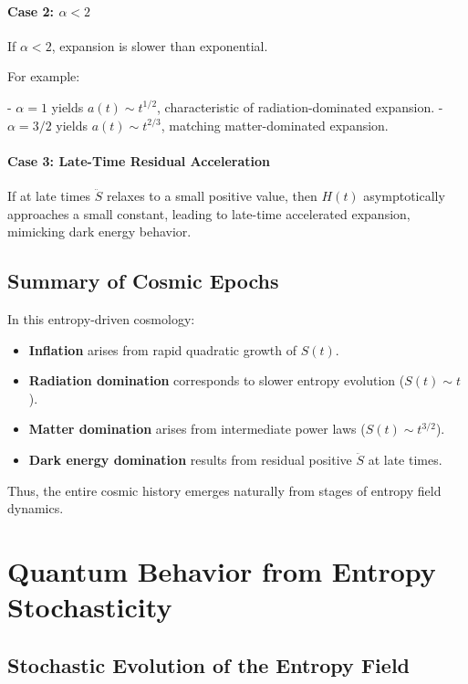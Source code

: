 \documentclass{article}
\begin{document}
\paragraph{Case 2: $\alpha < 2$}

If $\alpha < 2$, expansion is slower than exponential.

For example:

- $\alpha = 1$ yields $a(t) \sim t^{1/2}$, characteristic of radiation-dominated expansion.
- $\alpha = 3/2$ yields $a(t) \sim t^{2/3}$, matching matter-dominated expansion.

\paragraph{Case 3: Late-Time Residual Acceleration}

If at late times $\ddot{S}$ relaxes to a small positive value, then $H(t)$ asymptotically approaches a small constant, leading to late-time accelerated expansion, mimicking dark energy behavior.

\subsection{Summary of Cosmic Epochs}

In this entropy-driven cosmology:

\begin{itemize}
    \item \textbf{Inflation} arises from rapid quadratic growth of $S(t)$.
    \item \textbf{Radiation domination} corresponds to slower entropy evolution ($S(t) \sim t$).
    \item \textbf{Matter domination} arises from intermediate power laws ($S(t) \sim t^{3/2}$).
    \item \textbf{Dark energy domination} results from residual positive $\ddot{S}$ at late times.
\end{itemize}

Thus, the entire cosmic history emerges naturally from stages of entropy field dynamics.

\section{Quantum Behavior from Entropy Stochasticity}

\subsection{Stochastic Evolution of the Entropy Field}
\end{document}
